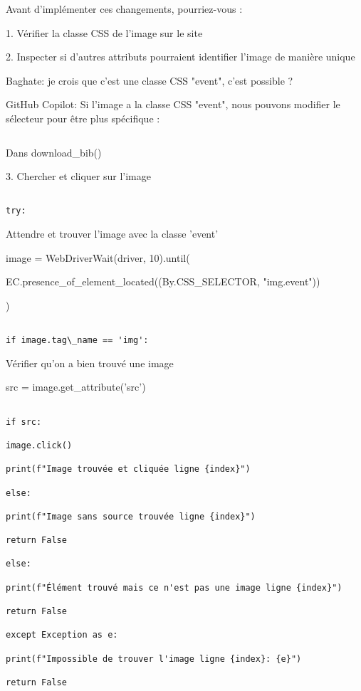 Avant d'implémenter ces changements, pourriez-vous :

1. Vérifier la classe CSS de l'image sur le site

2. Inspecter si d'autres attributs pourraient identifier l'image de manière unique

Baghate: je crois que c'est une classe CSS "event", c'est possible ?

GitHub Copilot: Si l'image a la classe CSS "event", nous pouvons modifier le sélecteur pour être plus spécifique :

\begin{verbatim}

\end{verbatim}

  Dans download\_bib()

  3. Chercher et cliquer sur l'image

\begin{verbatim}

try:

\end{verbatim}

  Attendre et trouver l'image avec la classe 'event'

image = WebDriverWait(driver, 10).until(

EC.presence\_of\_element\_located((By.CSS\_SELECTOR, "img.event"))

)

\begin{verbatim}

if image.tag\_name == 'img':

\end{verbatim}

  Vérifier qu'on a bien trouvé une image

src = image.get\_attribute('src')

\begin{verbatim}

if src:

image.click()

print(f"Image trouvée et cliquée ligne {index}")

else:

print(f"Image sans source trouvée ligne {index}")

return False

else:

print(f"Élément trouvé mais ce n'est pas une image ligne {index}")

return False

except Exception as e:

print(f"Impossible de trouver l'image ligne {index}: {e}")

return False

\end{verbatim}


